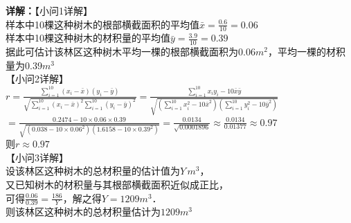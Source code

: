 \begin{question}[points=12]
\begin{solution}
\textbf{详解：}【小问1详解】\\样本中10棵这种树木的根部横截面积的平均值$\bar{x} = \frac{0.6}{10} = 0.06$\\样本中10棵这种树木的材积量的平均值$\bar{y} = \frac{3.9}{10} = 0.39$\\据此可估计该林区这种树木平均一棵的根部横截面积为$0.06m^2$，平均一棵的材积量为$0.39m^3$\\【小问2详解】\\$r = \frac{\sum\limits_{i=1}^{10} (x_i-\bar{x})(y_i-\bar{y})}{\sqrt{\sum\limits_{i=1}^{10} (x_i-\bar{x})^2 \sum\limits_{i=1}^{10} (y_i-\bar{y})^2}} = \frac{\sum\limits_{i=1}^{10} x_i y_i - 10\bar{x}\bar{y}}{\sqrt{(\sum\limits_{i=1}^{10} x_i^2 - 10\bar{x}^2)(\sum\limits_{i=1}^{10} y_i^2 - 10\bar{y}^2)}}$\\$= \frac{0.2474 - 10\times0.06\times0.39}{\sqrt{(0.038 - 10\times0.06^2)(1.6158 - 10\times0.39^2)}} = \frac{0.0134}{\sqrt{0.0001896}} \approx \frac{0.0134}{0.01377} \approx 0.97$\\则$r \approx 0.97$\\【小问3详解】\\设该林区这种树木的总材积量的估计值为$Y\,m^3$，\\又已知树木的材积量与其根部横截面积近似成正比，\\可得$\frac{0.06}{0.39} = \frac{186}{Y}$，解之得$Y=1209m^3$．\\则该林区这种树木的总材积量估计为$1209m^3$
\end{solution}
\end{question}

